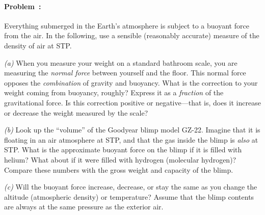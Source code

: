 \documentclass[12pt]{article}
\newcounter{problem}
\begin{document}

\paragraph{Problem~\theproblem:}%
Everything submerged in the Earth's atmosphere is subject to a buoyant
force from the air.  In the following, use a sensible (reasonably
accurate) measure of the density of air at STP.

\textsl{(a)} When you measure your weight on a standard bathroom
scale, you are measuring the \emph{normal force} between yourself and
the floor.  This normal force opposes the \emph{combination} of
gravity and buoyancy.  What is the correction to your weight coming
from buoyancy, roughly?  Express it as a \emph{fraction} of the
gravitational force.  Is this correction positive or negative---that
is, does it increase or decrease the weight measured by the scale?

\textsl{(b)} Look up the ``volume'' of the Goodyear blimp model GZ-22.
Imagine that it is floating in an air atmosphere at STP, and that the
gas inside the blimp is \emph{also} at STP.  What is the approximate
buoyant force on the blimp if it is filled with helium?  What about if
it were filled with hydrogen (molecular hydrogen)?  Compare these
numbers with the gross weight and capacity of the blimp.

\textsl{(c)} Will the buoyant force increase, decrease, or stay the
same as you change the altitude (atmospheric density) or temperature?
Assume that the blimp contents are always at the same pressure as the
exterior air.
\end{document}
